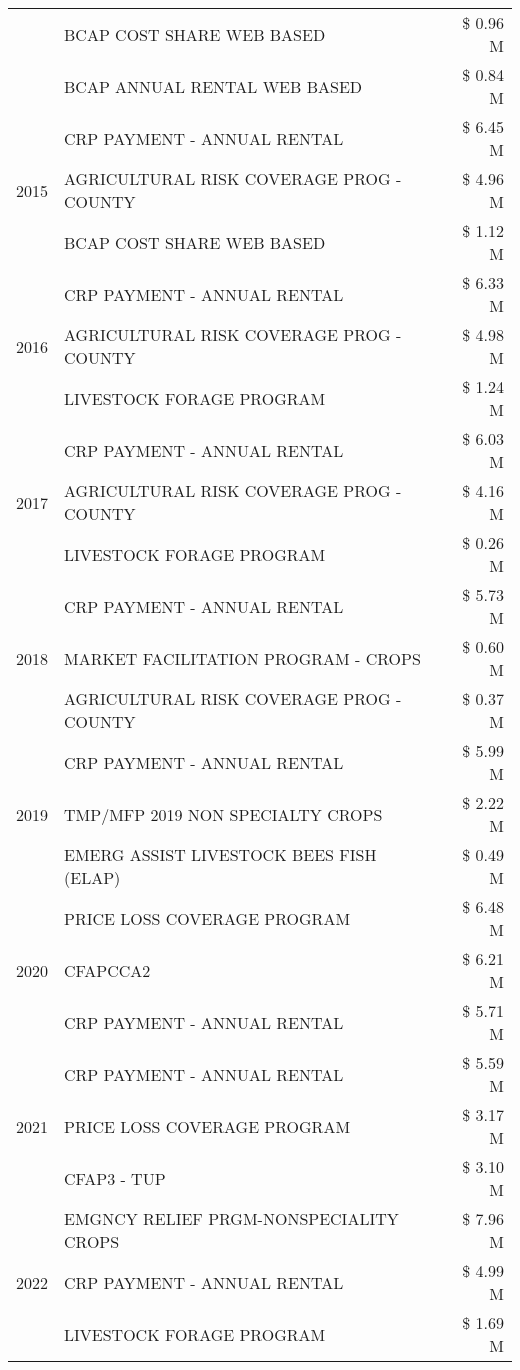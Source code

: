 \begin{tabular}{llr}
 & BCAP COST SHARE WEB BASED & \$ 0.96 M \\
 & BCAP ANNUAL RENTAL WEB BASED & \$ 0.84 M \\
\cline{1-3}
\multirow[t]{3}{*}{2015} & CRP PAYMENT - ANNUAL RENTAL & \$ 6.45 M \\
 & AGRICULTURAL RISK COVERAGE PROG - COUNTY & \$ 4.96 M \\
 & BCAP COST SHARE WEB BASED & \$ 1.12 M \\
\cline{1-3}
\multirow[t]{3}{*}{2016} & CRP PAYMENT - ANNUAL RENTAL & \$ 6.33 M \\
 & AGRICULTURAL RISK COVERAGE PROG - COUNTY & \$ 4.98 M \\
 & LIVESTOCK FORAGE PROGRAM & \$ 1.24 M \\
\cline{1-3}
\multirow[t]{3}{*}{2017} & CRP PAYMENT - ANNUAL RENTAL & \$ 6.03 M \\
 & AGRICULTURAL RISK COVERAGE PROG - COUNTY & \$ 4.16 M \\
 & LIVESTOCK FORAGE PROGRAM & \$ 0.26 M \\
\cline{1-3}
\multirow[t]{3}{*}{2018} & CRP PAYMENT - ANNUAL RENTAL & \$ 5.73 M \\
 & MARKET FACILITATION PROGRAM - CROPS & \$ 0.60 M \\
 & AGRICULTURAL RISK COVERAGE PROG - COUNTY & \$ 0.37 M \\
\cline{1-3}
\multirow[t]{3}{*}{2019} & CRP PAYMENT - ANNUAL RENTAL & \$ 5.99 M \\
 & TMP/MFP 2019 NON SPECIALTY CROPS & \$ 2.22 M \\
 & EMERG ASSIST LIVESTOCK BEES FISH (ELAP) & \$ 0.49 M \\
\cline{1-3}
\multirow[t]{3}{*}{2020} & PRICE LOSS COVERAGE PROGRAM & \$ 6.48 M \\
 & CFAPCCA2 & \$ 6.21 M \\
 & CRP PAYMENT - ANNUAL RENTAL & \$ 5.71 M \\
\cline{1-3}
\multirow[t]{3}{*}{2021} & CRP PAYMENT - ANNUAL RENTAL & \$ 5.59 M \\
 & PRICE LOSS COVERAGE PROGRAM & \$ 3.17 M \\
 & CFAP3 - TUP & \$ 3.10 M \\
\cline{1-3}
\multirow[t]{3}{*}{2022} & EMGNCY RELIEF PRGM-NONSPECIALITY CROPS & \$ 7.96 M \\
 & CRP PAYMENT - ANNUAL RENTAL & \$ 4.99 M \\
 & LIVESTOCK FORAGE PROGRAM & \$ 1.69 M \\
\cline{1-3}
\bottomrule
\end{tabular}
